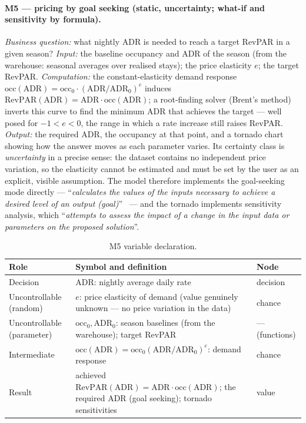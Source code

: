 \paragraph{M5 --- pricing by goal seeking (static, uncertainty; what-if and sensitivity by formula).}
\emph{Business question:} what nightly ADR is needed to reach a target RevPAR in a given season? \emph{Input:} the baseline occupancy and ADR of the season (from the warehouse: seasonal averages over realised stays); the price elasticity $e$; the target RevPAR. \emph{Computation:} the constant-elasticity demand response $\text{occ}(\text{ADR}) = \text{occ}_0 \cdot (\text{ADR}/\text{ADR}_0)^{e}$ induces $\text{RevPAR}(\text{ADR}) = \text{ADR} \cdot \text{occ}(\text{ADR})$; a root-finding solver (Brent's method) inverts this curve to find the minimum ADR that achieves the target --- well posed for $-1 < e < 0$, the range in which a rate increase still raises RevPAR. \emph{Output:} the required ADR, the occupancy at that point, and a tornado chart showing how the answer moves as each parameter varies. Its certainty class is \emph{uncertainty} in a precise sense: the dataset contains no independent price variation, so the elasticity cannot be estimated and must be set by the user as an explicit, visible assumption. The model therefore implements the goal-seeking mode directly --- ``\emph{calculates the values of the inputs necessary to achieve a desired level of an output (goal)}''~\cite{turban2011} --- and the tornado implements sensitivity analysis, which ``\emph{attempts to assess the impact of a change in the input data or parameters on the proposed solution}''.

\begin{table}[H]
\centering
\caption{M5 variable declaration.}
\label{tab:m5vars}
\begin{tabularx}{0.92\textwidth}{@{}l X l@{}}
\toprule
\textbf{Role} & \textbf{Symbol and definition} & \textbf{Node} \\
\midrule
Decision & $\mathrm{ADR}$: nightly average daily rate & decision \\
Uncontrollable (random) & $e$: price elasticity of demand (value genuinely unknown --- no price variation in the data) & chance \\
Uncontrollable (parameter) & $\mathrm{occ}_0, \mathrm{ADR}_0$: season baselines (from the warehouse); target RevPAR & --- (functions) \\
Intermediate & $\mathrm{occ}(\mathrm{ADR}) = \mathrm{occ}_0 (\mathrm{ADR}/\mathrm{ADR}_0)^{e}$: demand response & chance \\
Result & achieved $\mathrm{RevPAR}(\mathrm{ADR}) = \mathrm{ADR} \cdot \mathrm{occ}(\mathrm{ADR})$; the required ADR (goal seeking); tornado sensitivities & value \\
\bottomrule
\end{tabularx}
\end{table}

